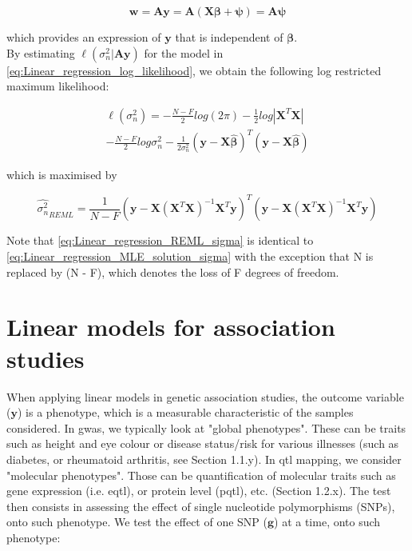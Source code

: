\begin{equation}\label{eq:REML_w_projection}
    \mathbf{w} = \mathbf{A}\mathbf{y} = \mathbf{A}(\mathbf{X}\boldsymbol{\beta} + \boldsymbol{\psi}) = \mathbf{A}\boldsymbol{\psi}
\end{equation}

which provides an expression of $\mathbf{y}$ that is independent of $\boldsymbol{\beta}$.\\

By estimating $\ell(\sigma_n^2 | \mathbf{A}\mathbf{y} )$ for the model in \eqref{eq:Linear_regression_log_likelihood}, we obtain the following log restricted maximum likelihood:

\begin{equation} \label{eq:Linear_regression_log_restricted_likelihood}
\begin{split}
\ell(\sigma_n^2) = -\frac{N-F}{2}log(2\pi) - \frac{1}{2}log|\mathbf{X}^T\mathbf{X}| \\
-  \frac{N-F}{2}log\sigma_n^2 - \frac{1}{2\sigma_n^2}(\mathbf{y}-\mathbf{X}\hat{\boldsymbol{\beta}})^T(\mathbf{y}-\mathbf{X}\hat{\boldsymbol{\beta}})  
\end{split}
\end{equation}

which is maximised by

\begin{equation}\label{eq:Linear_regression_REML_sigma}
\hat{\sigma_n^2}_{REML} =  \frac{1}{N-F}(\mathbf{y}-\mathbf{X}(\mathbf{X}^T\mathbf{X})^{-1}\mathbf{X}^T\mathbf{y})^T(\mathbf{y}-\mathbf{X}(\mathbf{X}^T\mathbf{X})^{-1}\mathbf{X}^T\mathbf{y})
\end{equation}

Note that \eqref{eq:Linear_regression_REML_sigma} is identical to \eqref{eq:Linear_regression_MLE_solution_sigma} with the exception that N is replaced by (N - F), which denotes the loss of F degrees of freedom.


\section{Linear models for association studies}

When applying linear models in genetic association studies, the outcome variable ($\mathbf{y}$) is a phenotype, which is a measurable characteristic of the samples considered. 
In \gls{gwas}, we typically look at "global phenotypes".
These can be traits such as height and eye colour or disease status/risk for various illnesses (such as diabetes, or rheumatoid arthritis, see Section 1.1.y).
In \gls{qtl} mapping, we consider "molecular phenotypes". 
Those can be quantification of molecular traits such as gene expression (i.e. e\gls{qtl}), or protein level (p\gls{qtl}), etc. (Section 1.2.x).
The test then consists in assessing the effect of single nucleotide polymorphisms (SNPs),  onto such phenotype. 
We test the effect of one SNP ($\mathbf{g}$) at a time, onto such phenotype:

